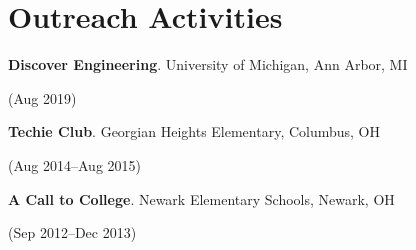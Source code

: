 \documentclass[letterpaper,10pt]{article}
\newcommand{\sidebyside}[2]{
  \begin{minipage}[t]{.75\textwidth}
    \raggedright{}
    #2
  \end{minipage}
  \hspace{.01\textwidth}
    \begin{minipage}[t]{.205\textwidth}
    \raggedleft
    #1
  \end{minipage}
}
\newcommand{\trio}[3]{\sidebyside{#3}{\textbf{#1}. #2}}
\begin{document}
\section{Outreach Activities}
\begin{smenumerate}
\item\trio{Discover Engineering}{University of Michigan, Ann Arbor, MI}{(Aug 2019)}
\item\trio{Techie Club}{Georgian Heights Elementary, Columbus, OH}{(Aug 2014--Aug 2015)}
\item\trio{A Call to College}{Newark Elementary Schools, Newark, OH}{(Sep 2012--Dec 2013)}
\end{smenumerate}
\end{document}
